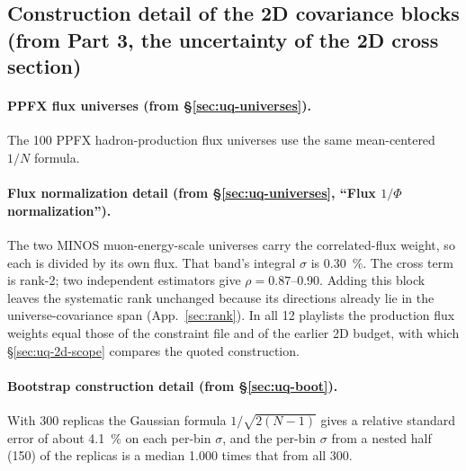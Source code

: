 

\subsection{Construction detail of the 2D covariance blocks (from Part 3, the uncertainty of the 2D cross section)}
\paragraph{PPFX flux universes (from \S\ref{sec:uq-universes}).}
The 100 PPFX hadron-production flux universes use the same mean-centered $1/N$ formula.

\paragraph{Flux normalization detail (from \S\ref{sec:uq-universes}, ``Flux $1/\Phi$ normalization'').}
The two MINOS muon-energy-scale universes carry the correlated-flux weight, so each is divided by its own flux. That band's integral $\sigma$ is \SI{0.30}{\percent}.
The cross term is rank-2; two independent estimators give $\rho=0.87$--$0.90$. Adding this block leaves the systematic rank unchanged because its directions already lie in the universe-covariance span (App.~\ref{sec:rank}).
In all 12 playlists the production flux weights equal those of the constraint file and of the earlier 2D budget, with which \S\ref{sec:uq-2d-scope} compares the quoted construction.

\paragraph{Bootstrap construction detail (from \S\ref{sec:uq-boot}).}
With 300 replicas the Gaussian formula $1/\sqrt{2(N-1)}$ gives a relative standard error of about \SI{4.1}{\percent} on each per-bin $\sigma$, and the per-bin $\sigma$ from a nested half (150) of the replicas is a median 1.000 times that from all 300.

